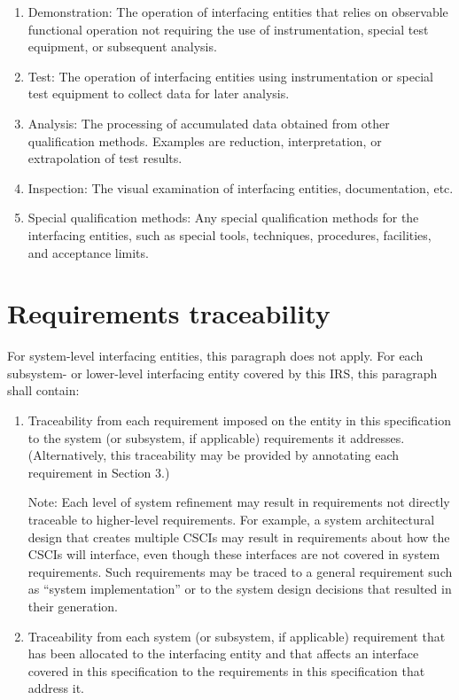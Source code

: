 \documentclass{fidata-report-template}
\begin{document}
\begin{enumerate}
\itemsep1pt\parskip0pt
\item
  Demonstration: The operation of interfacing entities that relies on
  observable functional operation not requiring the use of
  instrumentation, special test equipment, or subsequent analysis.
\item
  Test: The operation of interfacing entities using instrumentation or
  special test equipment to collect data for later analysis.
\item
  Analysis: The processing of accumulated data obtained from other
  qualification methods. Examples are reduction, interpretation, or
  extrapolation of test results.
\item
  Inspection: The visual examination of interfacing entities,
  documentation, etc.
\item
  Special qualification methods: Any special qualification methods for
  the interfacing entities, such as special tools, techniques,
  procedures, facilities, and acceptance limits.
\end{enumerate}

\section{Requirements traceability}

For system-level interfacing entities, this paragraph does not apply.
For each subsystem- or lower-level interfacing entity covered by this
IRS, this paragraph shall contain:

\begin{enumerate}
\itemsep1pt\parskip0pt
\item
  Traceability from each requirement imposed on the entity in this
  specification to the system (or subsystem, if applicable) requirements
  it addresses. (Alternatively, this traceability may be provided by
  annotating each requirement in Section 3.)

  Note: Each level of
  system refinement may result in requirements not directly traceable to
  higher-level requirements. For example, a system architectural design
  that creates multiple CSCIs may result in requirements about how the
  CSCIs will interface, even though these interfaces are not covered in
  system requirements. Such requirements may be traced to a general
  requirement such as ``system implementation'' or to the system design
  decisions that resulted in their generation.
\item
  Traceability from each system (or subsystem, if applicable)
  requirement that has been allocated to the interfacing entity and that
  affects an interface covered in this specification to the requirements
  in this specification that address it.
\end{enumerate}
\end{document}
